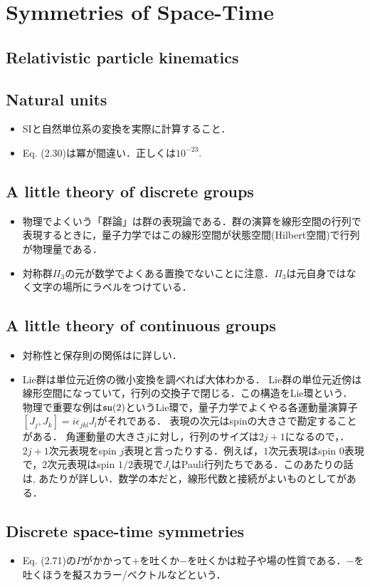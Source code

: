 \section{Symmetries of Space-Time}
\subsection{Relativistic particle kinematics}
\subsection{Natural units}
\begin{itemize}
		\item SIと自然単位系の変換を実際に計算すること．

		\item Eq. (2.30)は冪が間違い．正しくは$10^{-23} $.
\end{itemize}
\subsection{A little theory of discrete groups}
\begin{itemize}
		\item 物理でよくいう「群論」は群の表現論である．群の演算を線形空間の行列で表現するときに，量子力学ではこの線形空間が状態空間(Hilbert空間)で行列が物理量である．
		\item 対称群$\Pi_3 $の元が数学でよくある置換でないことに注意．$\Pi_3 $は元自身ではなく文字の場所にラベルをつけている．
\end{itemize}
\subsection{A little theory of continuous groups}
\begin{itemize}
		\item 対称性と保存則の関係は\cite[Chap.10, Sec.4]{BB17130464}に詳しい．
		\item Lie群は単位元近傍の微小変換を調べれば大体わかる．
				Lie群の単位元近傍は線形空間になっていて，行列の交換子で閉じる．この構造をLie環という．
				物理で重要な例は$\mathfrak{su}(2) $というLie環で，量子力学でよくやる各運動量演算子$[J_j, J_k] = i\epsilon_{jkl}J_l $がそれである．
				表現の次元はspinの大きさで勘定することがある．
				角運動量の大きさ$j $に対し，行列のサイズは$2j + 1 $になるので，．$2j+1 $次元表現をspin $j $表現と言ったりする．例えば，$1 $次元表現はspin $0 $表現で，$2 $次元表現はspin $1/2 $表現で$J_i $はPauli行列たちである．このあたりの話は\cite[Chap.3]{BB03663366}, \cite{BN10398292}あたりが詳しい．数学の本だと，線形代数と接続がよいものとして\cite{BC13565134}がある．
\end{itemize}
\subsection{Discrete space-time symmetries}
\begin{itemize}
		\item Eq. (2.71)の$P $がかかって$+ $を吐くか$- $を吐くかは粒子や場の性質である．$- $を吐くほうを擬スカラー/ベクトルなどという．
\end{itemize}
